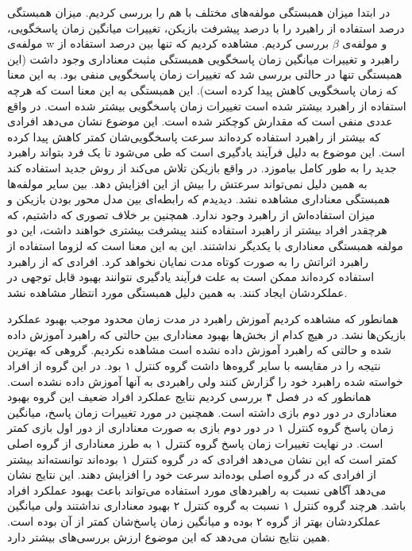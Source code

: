 \documentclass[twoside, a4paper,11pt]{book}
\numberwithin{equation}{chapter}
\numberwithin{table}{chapter}
\numberwithin{figure}{chapter}
\numberwithin{equation}{chapter}
\begin{document}
در ابتدا میزان همبستگی مولفه‌های مختلف با هم را بررسی کردیم. میزان همبستگی درصد استفاده از راهبرد را با درصد پیشرفت بازیکن، تغییرات میانگین زمان پاسخگویی، مولفه‌ی w و مولفه‌ی $\beta$ بررسی کردیم. مشاهده کردیم که تنها بین درصد استفاده از راهبرد و تغییرات میانگین زمان پاسخگویی همبستگی مثبت معناداری وجود داشت (این همبستگی تنها در حالتی بررسی شد که تغییرات زمان پاسخگویی منفی بود. به این معنا که زمان پاسخگویی کاهش پیدا کرده است). این همبستگی به این معنا است که هرچه استفاده از راهبرد بیشتر شده است تغییرات زمان پاسخگویی بیشتر شده است. در واقع عددی منفی است که مقدارش کوچکتر شده است. این موضوع نشان می‌دهد افرادی که بیشتر از راهبرد استفاده کرده‌اند سرعت پاسخگویی‌شان کمتر کاهش پیدا کرده است. این موضوع به دلیل فرآیند یادگیری است که طی می‌شود تا یک فرد بتواند راهبرد جدید را به طور کامل بیاموزد. در واقع بازیکن تلاش می‌کند از روش جدید استفاده کند به همین دلیل نمی‌تواند سرعتش را بیش از این افزایش دهد. بین سایر مولفه‌ها همبستگی معناداری مشاهده نشد. دیدیدم که رابطه‌ای بین مدل محور بودن بازیکن و میزان استفاده‌اش از راهبرد وجود ندارد. همچنین بر خلاف تصوری که داشتیم، که هرچقدر افراد بیشتر از راهبرد استفاده کنند پیشرفت بیشتری خواهند داشت، این دو مولفه همبستگی معناداری با یکدیگر نداشتند. این به این معنا است که لزوما استفاده از راهبرد اثراتش را به صورت کوتاه مدت نمایان نخواهد کرد. افرادی که از راهبرد استفاده کرده‌اند ممکن است به علت فرآیند یادگیری نتوانند بهبود قابل توجهی در عملکردشان ایجاد کنند. به همین دلیل همبستگی مورد انتظار مشاهده نشد.

همانطور که مشاهده کردیم آموزش راهبرد در مدت زمان محدود موجب بهبود عملکرد بازیکن‌ها نشد. در هیچ کدام از بخش‌ها بهبود معناداری بین حالتی که راهبرد آموزش داده شده و حالتی که راهبرد آموزش داده نشده است مشاهده نکردیم. گروهی که بهترین نتیجه را در مقایسه با سایر گروه‌ها داشت گروه کنترل ۱ بود. در این گروه از افراد خواسته شده راهبرد خود را گزارش کنند ولی راهبردی به آنها آموزش داده نشده است. همانطور که در فصل ۴ بررسی کردیم نتایج عملکرد افراد ضعیف این گروه بهبود معناداری در دور دوم بازی داشته است. همچنین در مورد تغییرات زمان پاسخ، میانگین زمان پاسخ گروه کنترل ۱ در دور دوم بازی به صورت معناداری از دور اول بازی کمتر است. در نهایت تغییرات زمان پاسخ گروه کنترل ۱ به طرز معناداری از گروه اصلی کمتر است که این نشان می‌دهد افرادی که در گروه کنترل ۱ بوده‌اند توانسته‌اند بیشتر از افرادی که در گروه اصلی بوده‌اند سرعت خود را افزایش دهند. این نتایج نشان می‌دهد آگاهی نسبت به راهبردهای مورد استفاده می‌تواند باعث بهبود عملکرد افراد باشد. هرچند گروه کنترل ۱ نسبت به گروه کنترل ۲ بهبود معناداری نداشتند ولی میانگین عملکردشان بهتر از گروه ۲ بوده و میانگین زمان پاسخ‌شان کمتر از آن بوده است. همین نتایج نشان می‌دهد که این موضوع ارزش بررسی‌های بیشتر دارد.
\end{document}
